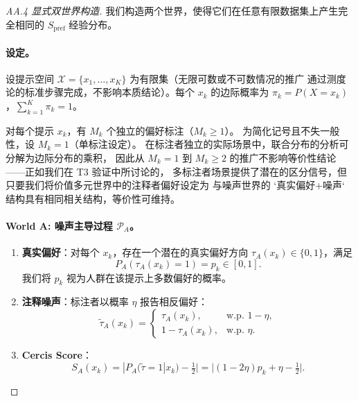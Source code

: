 \documentclass[12pt,a4paper]{article}
\newcommand{\cX}{\mathcal{X}}
\begin{document}
\begin{proof}[AA.4 显式双世界构造]

我们构造两个世界，使得它们在任意有限数据集上产生完全相同的 $S_{\mathrm{pref}}$ 经验分布。

\paragraph{设定。}
设提示空间 $\cX = \{x_1,\dots,x_K\}$ 为有限集（无限可数或不可数情况的推广
通过测度论的标准步骤完成，不影响本质结论）。每个 $x_k$ 的边际概率为
$\pi_k = P(X=x_k)$，$\sum_{k=1}^K \pi_k = 1$。

对每个提示 $x_k$，有 $M_k$ 个独立的偏好标注（$M_k \geq 1$）。
为简化记号且不失一般性，设 $M_k = 1$（单标注设定）。
在标注者独立的实际场景中，联合分布的分析可分解为边际分布的乘积，
因此从 $M_k=1$ 到 $M_k\geq 2$ 的推广不影响等价性结论——正如我们在 T3 验证中所讨论的，
多标注者场景提供了潜在的区分信号，但只要我们将价值多元世界中的注释者偏好设定为
与噪声世界的 `真实偏好+噪声` 结构具有相同相关结构，等价性可维持。

\paragraph{World A: 噪声主导过程 $\mathcal{P}_A$。}
\begin{enumerate}
    \item \textbf{真实偏好}：对每个 $x_k$，存在一个潜在的真实偏好方向
          $\tau_A(x_k) \in \{0,1\}$，满足
          \[
          P_A(\tau_A(x_k)=1) = p_k \in [0,1].
          \]
          我们将 $p_k$ 视为人群在该提示上多数偏好的概率。
    \item \textbf{注释噪声}：标注者以概率 $\eta$ 报告相反偏好：
          \[
          \tilde{\tau}_A(x_k) =
          \begin{cases}
          \tau_A(x_k), & \text{w.p. } 1-\eta,\\
          1-\tau_A(x_k), & \text{w.p. } \eta.
          \end{cases}
          \]
    \item \textbf{Cercis Score}：
          \[
          S_A(x_k) = |P_A(\tilde{\tau}=1|x_k) - \tfrac12|
          = |(1-2\eta)p_k + \eta - \tfrac12|.
          \]
\end{enumerate}


\end{proof}
\end{document}
